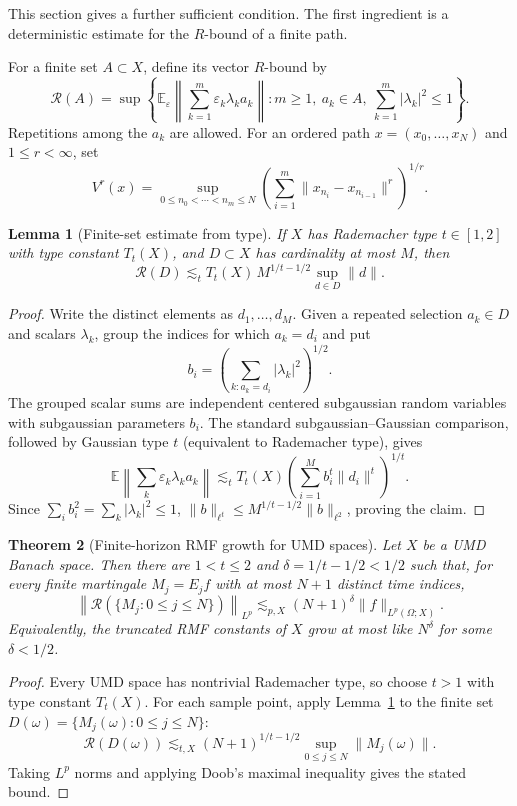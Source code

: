 \documentclass[11pt]{article}
\newtheorem{theorem}{Theorem}[section]
\newtheorem{lemma}[theorem]{Lemma}
\theoremstyle{definition}
\newcommand{\E}{\mathbb E}
\newcommand{\cR}{\mathcal R}
\newcommand{\1}{\mathbf 1}
\newcommand{\eps}{\varepsilon}
\begin{document}
This section gives a further sufficient condition.  The first ingredient is a
deterministic estimate for the $R$-bound of a finite path.

For a finite set $A\subset X$, define its vector $R$-bound by
\[
 \cR(A)=\sup\left\{
 \E_\eps\left\|\sum_{k=1}^m\eps_k\lambda_ka_k\right\|:
 m\ge1,\ a_k\in A,\ \sum_{k=1}^m|\lambda_k|^2\le1
 \right\}.
\]
Repetitions among the $a_k$ are allowed.  For an ordered path
$x=(x_0,\ldots,x_N)$ and $1\le r<\infty$, set
\[
 V^r(x)=\sup_{0\le n_0<\cdots<n_m\le N}
 \left(\sum_{i=1}^m\|x_{n_i}-x_{n_{i-1}}\|^r\right)^{1/r}.
\]

\begin{lemma}[Finite-set estimate from type]\label{lem:finite-set-type}
If $X$ has Rademacher type $t\in[1,2]$ with type constant $T_t(X)$, and
$D\subset X$ has cardinality at most $M$, then
\[
 \cR(D)\lesssim_t T_t(X)\,M^{1/t-1/2}\sup_{d\in D}\|d\|.
\]
\end{lemma}

\begin{proof}
Write the distinct elements as $d_1,\ldots,d_M$.  Given a repeated selection
$a_k\in D$ and scalars $\lambda_k$, group the indices for which $a_k=d_i$ and
put
\[
 b_i=\left(\sum_{k:a_k=d_i}|\lambda_k|^2\right)^{1/2}.
\]
The grouped scalar sums are independent centered subgaussian random variables
with subgaussian parameters $b_i$.  The standard subgaussian--Gaussian
comparison, followed by Gaussian type $t$ (equivalent to Rademacher type), gives
\[
 \E\left\|\sum_k\eps_k\lambda_ka_k\right\|
 \lesssim_t T_t(X)
 \left(\sum_{i=1}^M b_i^t\|d_i\|^t\right)^{1/t}.
\]
Since $\sum_i b_i^2=\sum_k|\lambda_k|^2\le1$,
$\|b\|_{\ell^t}\le M^{1/t-1/2}\|b\|_{\ell^2}$, proving the claim.
\end{proof}

\begin{theorem}[Finite-horizon RMF growth for UMD spaces]
\label{thm:finite-horizon}
Let $X$ be a UMD Banach space.  Then there are $1<t\le2$ and
$\delta=1/t-1/2<1/2$ such that, for every finite martingale
$M_j=E_jf$ with at most $N+1$ distinct time indices,
\[
  \left\|\cR(\{M_j:0\le j\le N\})\right\|_{L^p}
  \lesssim_{p,X} (N+1)^\delta
  \|f\|_{L^p(\Omega;X)}.
\]
Equivalently, the truncated RMF constants of $X$ grow at most like
$N^\delta$ for some $\delta<1/2$.
\end{theorem}

\begin{proof}
Every UMD space has nontrivial Rademacher type, so choose $t>1$ with type
constant $T_t(X)$.  For each sample point, apply
Lemma~\ref{lem:finite-set-type} to the finite set
$D(\omega)=\{M_j(\omega):0\le j\le N\}$:
\[
 \cR(D(\omega))
 \lesssim_{t,X}
 (N+1)^{1/t-1/2}\sup_{0\le j\le N}\|M_j(\omega)\|.
\]
Taking $L^p$ norms and applying Doob's maximal inequality gives the stated
bound.
\end{proof}
\end{document}
